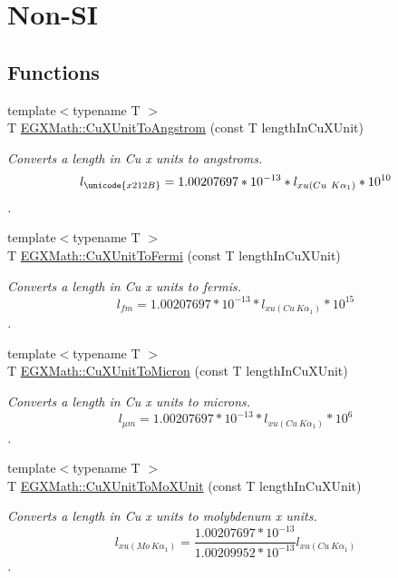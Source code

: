 \hypertarget{group___e_g_x_math-_conversions-_length_conversions-_non-_s_i-_cu_x_unit-_non-_s_i}{}\section{Non-\/\+SI}
\label{group___e_g_x_math-_conversions-_length_conversions-_non-_s_i-_cu_x_unit-_non-_s_i}
\subsection*{Functions}
\begin{DoxyCompactItemize}
\item 
{\footnotesize template$<$typename T $>$ }\\T \mbox{\hyperlink{group___e_g_x_math-_conversions-_length_conversions-_non-_s_i-_cu_x_unit-_non-_s_i_ga0ccb6fe91bb6437a1c41674613e2e395}{E\+G\+X\+Math\+::\+Cu\+X\+Unit\+To\+Angstrom}} (const T length\+In\+Cu\+X\+Unit)
\begin{DoxyCompactList}\small\item\em Converts a length in Cu x units to angstroms. \[ l_{\unicode{x212B}}=1.00207697*10^{-13} * l_{xu(Cu\ K\alpha_1)} * 10^{10} \]. \end{DoxyCompactList}\item 
{\footnotesize template$<$typename T $>$ }\\T \mbox{\hyperlink{group___e_g_x_math-_conversions-_length_conversions-_non-_s_i-_cu_x_unit-_non-_s_i_ga14c8dd2723d4482371d1ec42465f417f}{E\+G\+X\+Math\+::\+Cu\+X\+Unit\+To\+Fermi}} (const T length\+In\+Cu\+X\+Unit)
\begin{DoxyCompactList}\small\item\em Converts a length in Cu x units to fermis. \[ l_{fm}=1.00207697*10^{-13} * l_{xu(Cu\ K\alpha_1)} * 10^{15} \]. \end{DoxyCompactList}\item 
{\footnotesize template$<$typename T $>$ }\\T \mbox{\hyperlink{group___e_g_x_math-_conversions-_length_conversions-_non-_s_i-_cu_x_unit-_non-_s_i_ga382a9cae8bb23cf8d54777f5ccbff90b}{E\+G\+X\+Math\+::\+Cu\+X\+Unit\+To\+Micron}} (const T length\+In\+Cu\+X\+Unit)
\begin{DoxyCompactList}\small\item\em Converts a length in Cu x units to microns. \[ l_{\mu m}=1.00207697*10^{-13} * l_{xu(Cu\ K\alpha_1)} * 10^{6} \]. \end{DoxyCompactList}\item 
{\footnotesize template$<$typename T $>$ }\\T \mbox{\hyperlink{group___e_g_x_math-_conversions-_length_conversions-_non-_s_i-_cu_x_unit-_non-_s_i_gad93f4b59cc8e8f052b3cf8cad7c7b173}{E\+G\+X\+Math\+::\+Cu\+X\+Unit\+To\+Mo\+X\+Unit}} (const T length\+In\+Cu\+X\+Unit)
\begin{DoxyCompactList}\small\item\em Converts a length in Cu x units to molybdenum x units. \[ l_{xu(Mo\ K\alpha_1)}=\frac{1.00207697*10^{-13}}{1.00209952*10^{-13}} l_{xu(Cu\ K\alpha_1)}\]. \end{DoxyCompactList}\end{DoxyCompactItemize}


